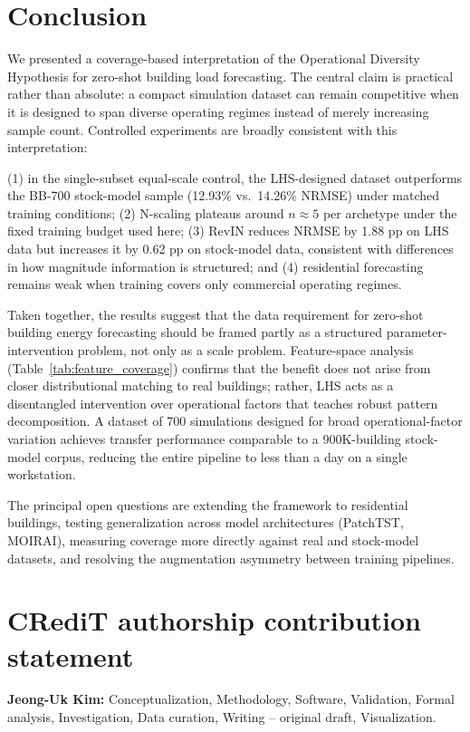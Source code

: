 \documentclass[preprint,12pt,authoryear]{elsarticle}
\begin{document}
\section{Conclusion}
\label{sec:conclusion}

We presented a coverage-based interpretation of the Operational Diversity Hypothesis for zero-shot building load forecasting. The central claim is practical rather than absolute: a compact simulation dataset can remain competitive when it is designed to span diverse operating regimes instead of merely increasing sample count. Controlled experiments are broadly consistent with this interpretation:

(1) in the single-subset equal-scale control, the LHS-designed dataset outperforms the BB-700 stock-model sample (12.93\% vs.\ 14.26\% NRMSE) under matched training conditions; (2) N-scaling plateaus around $n \approx 5$ per archetype under the fixed training budget used here; (3) RevIN reduces NRMSE by 1.88 pp on LHS data but increases it by 0.62 pp on stock-model data, consistent with differences in how magnitude information is structured; and (4) residential forecasting remains weak when training covers only commercial operating regimes.

Taken together, the results suggest that the data requirement for zero-shot building energy forecasting should be framed partly as a structured parameter-intervention problem, not only as a scale problem. Feature-space analysis (Table~\ref{tab:feature_coverage}) confirms that the benefit does not arise from closer distributional matching to real buildings; rather, LHS acts as a disentangled intervention over operational factors that teaches robust pattern decomposition. A dataset of 700 simulations designed for broad operational-factor variation achieves transfer performance comparable to a 900K-building stock-model corpus, reducing the entire pipeline to less than a day on a single workstation.

The principal open questions are extending the framework to residential buildings, testing generalization across model architectures (PatchTST, MOIRAI), measuring coverage more directly against real and stock-model datasets, and resolving the augmentation asymmetry between training pipelines.

\section*{CRediT authorship contribution statement}
\textbf{Jeong-Uk Kim:} Conceptualization, Methodology, Software, Validation, Formal analysis, Investigation, Data curation, Writing -- original draft, Visualization.
\end{document}
